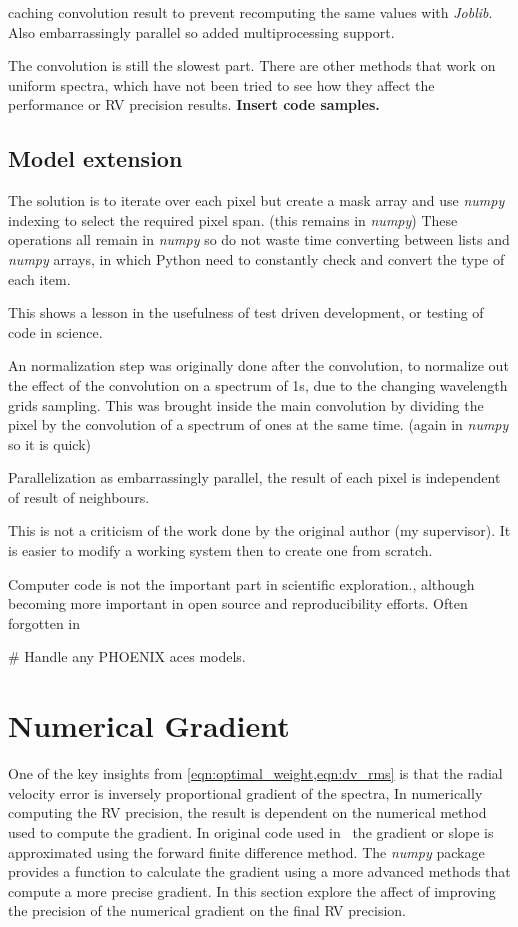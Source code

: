 caching convolution result to prevent recomputing the same values with \emph{Joblib}.
Also embarrassingly parallel so added multiprocessing support.

The convolution is still the slowest part.
There are other methods that work on uniform spectra, which have not been tried to see how they affect the performance or {RV} precision results.
\textbf{Insert code samples.}


\subsection{Model extension}
The solution is to iterate over each pixel but create a mask array and use \emph{numpy} indexing to select the required pixel span.
(this remains in \emph{numpy})
These operations all remain in \emph{numpy} so do not waste time converting between lists and \emph{numpy} arrays, in which Python need to constantly check and convert the type of each item.

This shows a lesson in the usefulness of test driven development, or testing of code in science.


An normalization step was originally done after the convolution, to normalize out the effect of the convolution on a spectrum of 1s, due to the changing wavelength grids sampling.
This was brought inside the main convolution by dividing the pixel by the convolution of a spectrum of ones at the same time.
 (again in \emph{numpy} so it is quick)

Parallelization as embarrassingly parallel, the result of each pixel is independent of result of neighbours.

This is not a criticism of the work done by the original author (my supervisor).
It is easier to modify a working system then to create one from scratch.

Computer code is not the important part in scientific exploration., although becoming more important in open source and reproducibility efforts.
Often forgotten in

\# Handle any {PHOENIX} aces models.


\section{Numerical Gradient}
\label{sec:numerical_gradient}
One of the key insights from \cref{eqn:optimal_weight,eqn:dv_rms} is that the radial velocity error is inversely proportional gradient of the spectra, In numerically computing the {RV} precision, the result is dependent on the numerical method used to compute the gradient.
In original code used in~\citet{figueira_radial_2016} the gradient or slope is approximated using the forward finite difference method.
The \emph{numpy} package provides a function to calculate the gradient using a more advanced methods that compute a more precise gradient.
In this section  explore the affect of improving the precision of the numerical gradient on the final {RV} precision.

